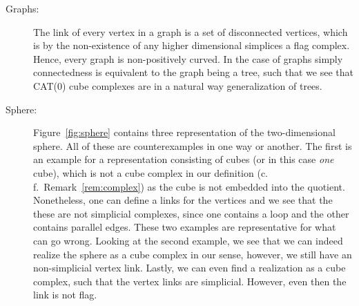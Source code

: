 \begin{bsp}
  \label{bsp:ccc}
  \begin{description}
  \item[Graphs:] The link of every vertex in a graph is a set of disconnected vertices, which is by the non-existence of any higher dimensional simplices a flag complex. Hence, every graph is non-positively curved. In the case of graphs simply connectedness is equivalent to the graph being a tree, such that we see that CAT(0) cube complexes are in a natural way generalization of trees.
  \item[Sphere:] Figure~\ref{fig:sphere} contains three representation of the two-dimensional sphere. All of these are counterexamples in one way or another. The first is an example for a representation consisting of cubes (or in this case \emph{one} cube), which is not a cube complex in our definition (c.\,f.\ Remark~\ref{rem:complex}) as the cube is not embedded  into the quotient. Nonetheless, one can define a links for the vertices and we see that the these are not simplicial complexes, since one contains a loop and the other contains parallel edges. These two examples are representative for what can go wrong. Looking at the second example, we see that we can indeed realize the sphere as a cube complex in our sense, however, we still have an non-simplicial vertex link. Lastly, we can even find a realization as a cube complex, such that the vertex links are simplicial. However, even then the link is not flag.


\end{description}
\end{bsp}
